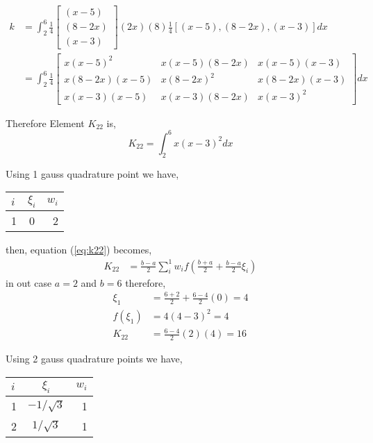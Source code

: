 \documentclass[a4paper]{memoir}
\begin{document}
\begin{align*}
	k &= \int_2^6 \frac{1}{4} {
	\begin{bmatrix}
		(x-5) \\
		(8-2x) \\
		(x-3)
	\end{bmatrix}
	} (2x) (8) \frac{1}{4} [(x-5),(8-2x),(x-3)]dx \\
	  &= \int_2^6 \frac{1}{4} {
	\begin{bmatrix}
				x(x-5)^2 & x(x-5)(8-2x) & x(x-5)(x-3) \\
				x(8-2x)(x-5) & x(8-2x)^2 & x(8-2x)(x-3) \\
				x(x-3)(x-5) & x(x-3)(8-2x) & x(x-3)^2
	\end{bmatrix}
	} dx
\end{align*}

Therefore Element $K_{22}$ is,
\begin{equation}
	K_{22} = \int_2^6 x(x-3)^2 dx
	\label{eq:k22}
\end{equation} 

Using 1 gauss quadrature point we have, \\

\begin{center}
	\begin{tabular}{l | c | r}
		\hline
		$i$ & 	$\xi_i$ 	&	$w_i$ \\ \hline
		1 	& 	0 				&	2		
	\end{tabular}
\end{center} 

then, equation (\ref{eq:k22}) becomes, 
\begin{align*}
	K_{22} &= \frac{b-a}{2} \sum_i^1 w_i f(\frac{b+a}{2}+\frac{b-a}{2}\xi_i)
\end{align*}
in out case $a=2$ and $b=6$ therefore, 
\begin{align*}
	\xi_1 &= \frac{6+2}{2}+\frac{6-4}{2}(0) = 4 \\
	f(\xi_1) &= 4(4-3)^2 = 4 \\
	K_{22} &= \frac{6-4}{2} (2) (4) = 16
\end{align*}

Using 2 gauss quadrature points we have, \\

\begin{center}
	\begin{tabular}{l | c | r}
		\hline
		$i$ & 	$\xi_i$ 		&	$w_i$ \\ \hline
		1 	& $-1/\sqrt{3}$	&	1			\\ \hline
		2 	& $1/\sqrt{3}$	&	1
	\end{tabular}
\end{center} 
\end{document}
